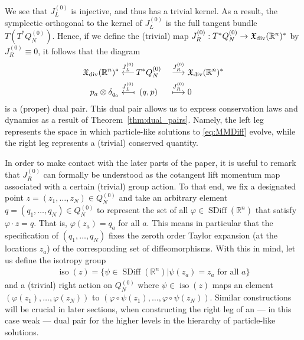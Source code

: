 \documentclass[12pt]{amsart}
\newcommand{\R}{\ensuremath{\mathbb{R}}}
\DeclareMathOperator{\SDiff}{SDiff}
\DeclareMathOperator{\iso}{iso}
\begin{document}
  We see that $J_L^{(0)}$ is injective, and thus has a trivial kernel. As a result, the symplectic orthogonal to the kernel of $J_L^{(0)}$  is the full tangent bundle $T(T^*Q_N^{(0)})$. Hence, if we define the (trivial) map $J_R^{(0)}: T^*Q^{(0)}_N \to \mathfrak{X}_{\rm div}(\mathbb{R}^n)^*$ by $J_R^{(0)} \equiv 0$, it follows that the diagram
 \begin{alignat*}{2}
    \mathfrak{X}_{\rm div}(\R^n)^* \stackrel{J_L^{(0)} }{\longleftarrow}&
    \,T^* Q_N^{(0)}
    &&\stackrel{J_R^{(0)} }{\longrightarrow} \mathfrak{X}_{\rm div}(\R^n)^* \\
    p_a \otimes \delta_{q_a} \stackrel{J_L^{(0)}}{\longmapsfrom}&
    \;\;(q,p)
    &&\stackrel{J_R^{(0)} }{\longmapsto} 0
  \end{alignat*}
  is a (proper) dual pair.
  This dual pair allows us to express conservation
  laws and dynamics as a result of Theorem~\ref{thm:dual_pairs}.
  Namely, the left leg represents the space in which particle-like
  solutions to \eqref{eq:MMDiff} evolve,
  while the right leg represents a (trivial) conserved quantity.

  In order to make contact with the later parts of the paper, it is useful to remark that $J_R^{(0)}$ can formally be understood as the cotangent lift momentum map associated with a certain (trivial) group action.
  To that end, we fix a designated point $z = (z_1, \ldots, z_N) \in Q_N^{(0)}$ and take an arbitrary element $ q= (q_1, \ldots, q_N) \in Q_N^{(0)}$ to represent the set of all $\varphi \in \SDiff(\mathbb{R}^n)$ that satisfy $\varphi \cdot z  = q$.
  That is, $\varphi(z_a) = q_a$ for all $a$.
  This means in particular that the specification of $(q_1, \ldots, q_N)$ fixes the zeroth order Taylor expansion (at the locations $z_a$) of the corresponding set of diffeomorphisms. With this in mind, let us define the isotropy group
\begin{align}
\iso(z)  = \{ \psi \in \SDiff(\mathbb{R}^n) | \psi(z_a) = z_a \mbox{ for all } a\} \label{eq:isotropy_group}
\end{align}
and a (trivial) right action on $Q_N^{(0)}$ where $\psi \in \iso(z)$ maps an element $(\varphi(z_1), \ldots, \varphi(z_N))$ to $( \varphi \circ \psi (z_1), \ldots, \varphi \circ \psi(z_N))$.
Similar constructions will be crucial in later sections, when
constructing the right leg of an --- in this case weak --- dual pair for the higher levels in the hierarchy of particle-like solutions.
\end{document}
